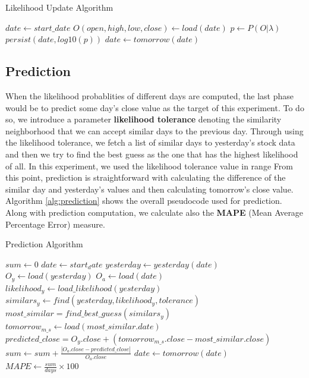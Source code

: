 \documentclass{acm_proc_article-sp}
\begin{document}
\begin{algorithm}[h] 
\caption{Likelihood Update Algorithm} \label{alg:likelihood}
\begin{algorithmic}[1]
\STATE $date \gets start\_date$
\STATE $ O(open, high, low, close) \gets load(date) $
\STATE $ p \gets P(O|\lambda) $ 
\STATE $ persist(date, log10(p)) $
\STATE $ date \gets tomorrow(date) $
\ENDFOR
\end{algorithmic}
\end{algorithm}

\subsection{Prediction} \label{sec:pred}
When the likelihood probablities of different days are computed, the last phase would be to predict some day's close
value as the target of this experiment. To do so, we introduce a parameter \textbf{likelihood tolerance} denoting the
similarity neighborhood that we can accept similar days to the previous day. Through using the likelihood tolerance, we
fetch a list of similar days to yesterday's stock data and then we try to find the best guess as the one that has the
highest likelihood of all. In this experiment, we used the likelihood tolerance value in range \boldmath{[0.001, 0.01]}
From this point, prediction is straightforward with calculating the difference of the similar day and yesterday's
values and then calculating tomorrow's close value. Algorithm \ref{alg:prediction} shows the overall pseudocode used
for prediction. Along with prediction computation, we calculate also the \textbf{MAPE} (Mean Average Percentage
Error) measure.

\begin{algorithm}[h]
\caption{Prediction Algorithm} \label{alg:prediction}
\begin{algorithmic}[1]
\STATE $ sum \gets 0 $
\STATE $ date \gets start_date $
\STATE $ yesterday \gets yesterday(date) $
\STATE $ O_y \gets load(yesterday) $
\STATE $ O_a \gets load(date)$
\STATE $ likelihood_y \gets load\_likelihood(yesterday) $
\STATE $ similars_y \gets find(yesterday, likelihood_y, tolerance) $
\STATE $ most\_similar = find\_best\_guess(similars_y) $
\STATE $ tomorrow_{m\_s} \gets load(most\_similar.date) $
\STATE $ predicted\_close = O_y.close + (tomorrow_{m\_s}.close - most\_similar.close) $
\STATE $ sum \gets sum + \frac{|O_a.close - predicted\_close|}{O_a.close} $
\STATE $ date \gets tomorrow(date) $
\ENDFOR
\STATE $ MAPE \gets \frac{sum}{days} \times 100 $
\end{algorithmic}
\end{algorithm}
\end{document}
